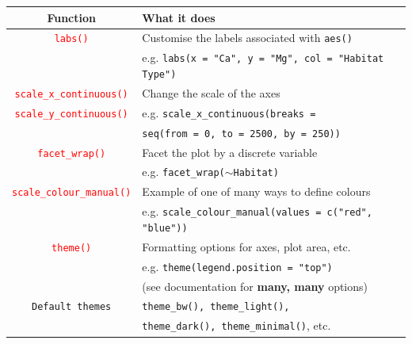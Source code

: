 \documentclass[a4paper,12pt]{article}
\newcommand\code[1]{\textcolor{red}{\texttt{#1}}}
\begin{document}
\begin{table}[h]
	\centering
	\begin{tabular}{cl}
		
		Function & What it does \\ \hline
		\code{labs()} & Customise the labels associated with \texttt{aes()} \\
		              & e.g. \texttt{labs(x = "Ca", y = "Mg", col = "Habitat Type")} \\ \hline
		\code{scale\_x\_continuous()} & Change the scale of the axes \\
		\code{scale\_y\_continuous()} & e.g. \texttt{scale\_x\_continuous(breaks =} \\
		                              & \hspace*{1cm}\texttt{seq(from = 0, to = 2500, by = 250))} \\ \hline
		\code{facet\_wrap()} & Facet the plot by a discrete variable \\
		                  & e.g. \texttt{facet\_wrap($\sim$Habitat)} \\  \hline
		\code{scale\_colour\_manual()} & Example of one of many ways to define colours \\
		                           & e.g. \texttt{scale\_colour\_manual(values = c("red", "blue"))} \\ \hline
		\code{theme()} & Formatting options for axes, plot area, etc. \\
		               & e.g. \texttt{theme(legend.position = "top")} \\
		               & (see documentation for \textbf{many, many} options) \\ \hline
		\texttt{Default themes} & \texttt{theme\_bw(), theme\_light(),} \\
		                        & \texttt{theme\_dark(), theme\_minimal()}, etc. \\
		\hline
		
	\end{tabular}
	 
	\label{tbl:ggplot_customisations}
\end{table}
\end{document}

